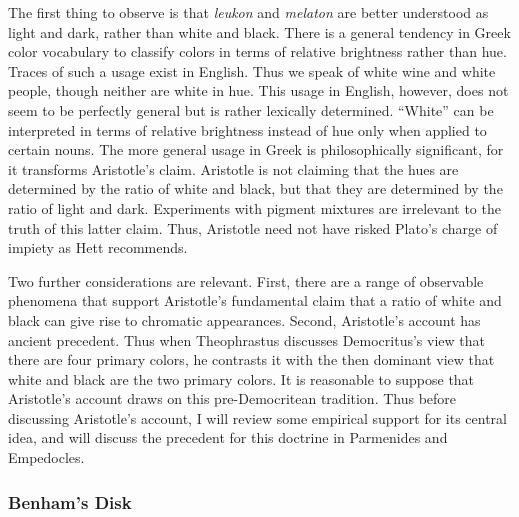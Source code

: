 The first thing to observe is that \emph{leukon} and \emph{melaton} are better understood as light and dark, rather than white and black. There is a general tendency in Greek color vocabulary to classify colors in terms of relative brightness rather than hue. Traces of such a usage exist in English. Thus we speak of white wine and white people, though neither are white in hue. This usage in English, however, does not seem to be perfectly general but is rather lexically determined. ``White'' can be interpreted in terms of relative brightness instead of hue only when applied to certain nouns. The more general usage in Greek is philosophically significant, for it transforms Aristotle's claim. Aristotle is not claiming that the hues are determined by the ratio of white and black, but that they are determined by the ratio of light and dark. Experiments with pigment mixtures are irrelevant to the truth of this latter claim. Thus, Aristotle need not have risked Plato's charge of impiety as Hett recommends. 

Two further considerations are relevant. First, there are a range of observable phenomena that support Aristotle's fundamental claim that a ratio of white and black can give rise to chromatic appearances. Second, Aristotle's account has ancient precedent. Thus when Theophrastus discusses Democritus's view that there are four primary colors, he contrasts it with the then dominant view that white and black are the two primary colors. It is reasonable to suppose that Aristotle's account draws on this pre-Democritean tradition. Thus before discussing Aristotle's account, I will review some empirical support for its central idea, and will discuss the precedent for this doctrine in Parmenides and Empedocles. \change

\begin{frame}[t]\frametitle{Benham's Disk}
	\begin{center}
	\end{center}
\end{frame}

